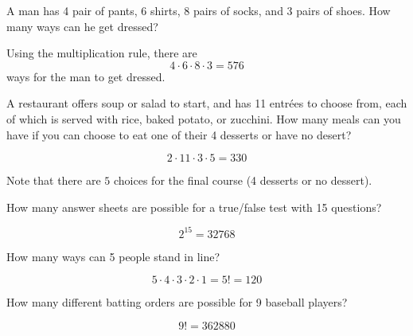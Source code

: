 \documentclass[answers,11pt]{exam}
\begin{document}
\begin{questions}
\question A man has 4 pair of pants, 6 shirts, 8 pairs of socks, and 3 pairs of
shoes.  How many ways can he get dressed?

\begin{solution}
Using the multiplication rule, there are
\[
  4 \cdot 6 \cdot 8 \cdot 3 = 576
\]
ways for the man to get dressed.
\end{solution}



\question A restaurant offers soup or salad to start, and has 11 entr\'ees to choose
from, each of which is served with rice, baked potato, or zucchini.   How many
meals can you have if you can choose to eat one of their 4 desserts or have no
desert?

\begin{solution}
\[
  2 \cdot 11 \cdot 3 \cdot 5 = 330
\]

Note that there are $5$ choices for the final course (4 desserts or no
dessert).

\end{solution}



\question How many answer sheets are possible for a true/false test with 15
questions?

\begin{solution}
\[
  2^{15} = 32768
\]
\end{solution}






\question How many ways can 5 people stand in line?

\begin{solution}
\[
  5 \cdot 4 \cdot 3 \cdot 2 \cdot 1 = 5! = 120
\]
\end{solution}



\question How many different batting orders are possible for 9 baseball players?

\begin{solution}
\[
  9! = 362880
\]
\end{solution}


\end{questions}
\end{document}
